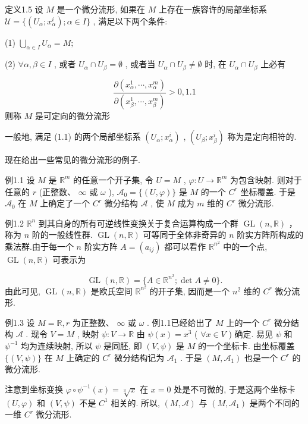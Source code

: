 定义1.5 设  $M$  是一个微分流形, 如果在  $M$  上存在一族容许的局部坐标系  $\mathcal{U} = \{(U_{\alpha}; x_{\alpha}^{i}); \alpha \in I\}$ , 满足以下两个条件:

(1)  $\bigcup_{\alpha \in I} U_{\alpha} = M;$

(2)  $\forall \alpha, \beta \in I$ , 或者  $U_{\alpha} \cap U_{\beta} = \emptyset$ , 或者当  $U_{\alpha} \cap U_{\beta} \neq \emptyset$  时, 在  $U_{\alpha} \cap U_{\beta}$  上必有

$$
\frac {\partial \left(x _ {\alpha} ^ {1} , \cdots , x _ {\alpha} ^ {m}\right)}{\partial \left(x _ {\beta} ^ {1} , \cdots , x _ {\beta} ^ {m}\right)} > 0, %
 {1.1}
$$
则称  $M$  是可定向的微分流形

一般地, 满足 (1.1) 的两个局部坐标系  $(U_{\alpha}; x_{\alpha}^{i})$ ,  $(U_{\beta}; x_{\beta}^{i})$  称为是定向相符的.


现在给出一些常见的微分流形的例子.

例1.1 设  $M$  是  $\mathbb{R}^m$  的任意一个开子集, 令  $U = M$ ,  $\varphi: U \to \mathbb{R}^m$  为包含映射. 则对于任意的  $r$  (正整数、 $\infty$  或  $\omega$ ),  $\mathcal{A}_0 = \{(U, \varphi)\}$  是  $M$  的一个  $C^r$  坐标覆盖. 于是  $\mathcal{A}_0$  在  $M$  上确定了一个  $C^r$  微分结构  $\mathcal{A}$ , 使  $M$  成为  $m$  维的  $C^r$  微分流形.

例1.2  $\mathbb{R}^n$  到其自身的所有可逆线性变换关于复合运算构成一个群  $\operatorname {GL}(n,\mathbb{R})$  ，称为  $n$  阶的一般线性群.  $\operatorname {GL}(n,\mathbb{R})$  可等同于全体非奇异的  $n$  阶实方阵所构成的乘法群.由于每一个  $n$  阶实方阵  $A = (a_{ij})$  都可以看作  $\mathbb{R}^{n^2}$  中的一个点,  $\operatorname {GL}(n,\mathbb{R})$  可表示为

$$
\operatorname {G L} (n, \mathbb {R}) = \{A \in \mathbb {R} ^ {n ^ {2}}; \det  A \neq 0 \}.
$$
由此可见,  $\operatorname{GL}(n, \mathbb{R})$  是欧氏空间  $\mathbb{R}^{n^2}$  的开子集, 因而是一个  $n^2$  维的  $C^r$  微分流形.

例1.3 设  $M = \mathbb{R}, r$  为正整数、 $\infty$  或  $\omega$ . 例1.1已经给出了  $M$  上的一个  $C^r$  微分结构  $\mathcal{A}$ . 现令  $V = M$ , 映射  $\psi : V \to \mathbb{R}$  由  $\psi(x) = x^3$  ( $\forall x \in V$ ) 确定. 易见  $\psi$  和  $\psi^{-1}$  均为连续映射, 所以  $\psi$  是同胚, 即  $(V, \psi)$  是  $M$  的一个坐标卡. 由坐标覆盖  $\{(V, \psi)\}$  在  $M$  上确定的  $C^r$  微分结构记为  $\mathcal{A}_1$ . 于是  $(M, \mathcal{A}_1)$  也是一个  $C^r$  的微分流形.

注意到坐标变换  $\varphi \circ \psi^{-1}(x) = \sqrt[3]{x}$  在  $x = 0$  处是不可微的, 于是这两个坐标卡  $(U, \varphi)$  和  $(V, \psi)$  不是  $C^1$  相关的. 所以,  $(M, \mathcal{A})$  与  $(M, \mathcal{A}_1)$  是两个不同的一维  $C^r$  微分流形.

